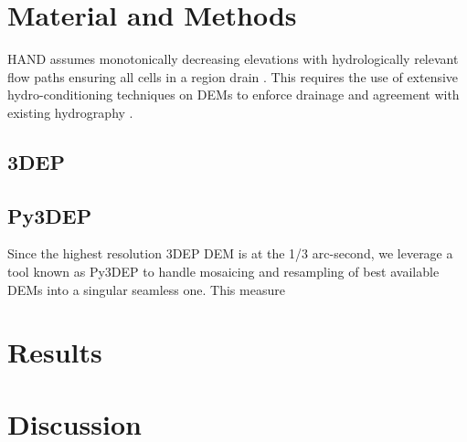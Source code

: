 \documentclass[preprint,review,12pt]{dependencies/elsarticle}
\begin{document}
\section{Material and Methods}
\label{sec:material_and_matheds}
%
\ac{HAND} assumes monotonically decreasing elevations with hydrologically relevant flow paths ensuring all cells in a region drain \citep{renno2008hand,nobre2011height,nobre2016hand}.
This requires the use of extensive hydro-conditioning techniques on \acp{DEM} to enforce drainage and agreement with existing hydrography \citep{aristizabal2022reducing,maidment2017conceptual,liu2016cybergis,liu2020height}.

\subsection{\ac{3DEP}}
\label{ssec:3dep}
%

\subsection{\acs{Py3DEP}}
\label{ssec:py3dep}

Since the highest resolution \ac{3DEP} \ac{DEM} is at the 1/3 arc-second, we leverage a tool known as \ac{Py3DEP} to handle mosaicing and resampling of best available \acp{DEM} into a singular seamless one.
This measure 

\section{Results}
\label{sec:results}
%

\section{Discussion}
\label{sec:discussion}
%
\end{document}
